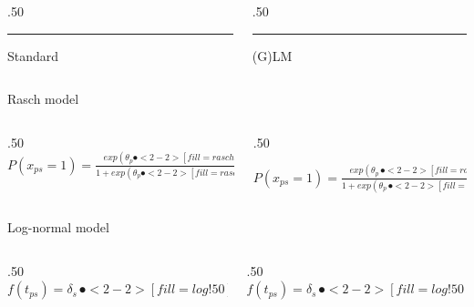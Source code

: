 \documentclass{beamer}
\begin{document}
\begin{frame}
	
	
	
	\begin{columns}[T] %
		\begin{column}{.50\linewidth}
			\textcolor{diff}{\rule{\linewidth}{2pt}}
			\begin{center}
				\textcolor{diff}{	\large{{Standard}}}
			\end{center}
			
		\end{column}
		
		\hfill%
		\begin{column}{.50\linewidth}
			\textcolor{single}{\rule{\linewidth}{2pt}}
			\begin{center}
				\textcolor{single}{\large{{(G)LM}}}	
			\end{center}
			
		\end{column}%
	\end{columns}
	
	\vspace{1.5mm}
	
	\begin{center}
		\Large\textcolor{rasch}{Rasch model}
	\end{center}
	
	\begin{columns}[T]
		\begin{column}{.50\linewidth}
			\vspace{1.5mm}
			$P(x_{ps} = 1) = \displaystyle \frac{exp(\theta_p \spot<2-2>[fill=rasch!50]{-} b_s)}{1 + exp(\theta_p \spot<2-2>[fill=rasch!50]{-} b_s)}$
		\end{column}
		\hfill
		
		\begin{column}{.50\linewidth}
			
			
			\vspace{1.5mm}
			$P(x_{ps} = 1) = \displaystyle \frac{exp(\theta_p \, \spot<2-2>[fill=rasch!50]{+} \, b_s)}{1 + exp(\theta_p \, \spot<2-2>[fill=rasch!50]{+} \, b_s)}$
		\end{column}
	\end{columns}
	
	
	\vspace{5mm}
	\begin{center}
		\Large\textcolor{log}{Log-normal model}
	\end{center}
	
	
	\begin{columns}[T]
		\begin{column}{.50\linewidth}
			\centering
			$f (t_{ps}) =  \delta_s \, \spot<2-2>[fill=log!50]{-} \, \tau_p \, + \, \varepsilon $
		\end{column}
		\hfill
		
		\begin{column}{.50\linewidth}
			\centering
			$f(t_{ps}) =  \delta_s \, \spot<2-2>[fill=log!50]{+} \, \tau_p \, +  \, \varepsilon$
		\end{column}
	\end{columns}	
\end{frame}
\end{document}
